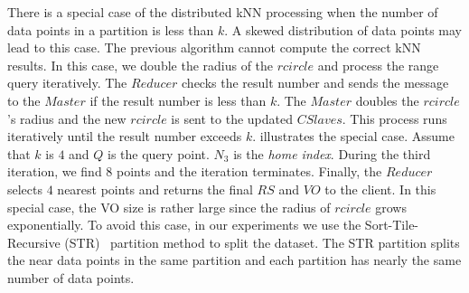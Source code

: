 There is a special case of the distributed kNN processing when the number of data points in a partition is less than $k$. A skewed distribution of data points may lead to this case. The previous algorithm cannot compute the correct kNN results. In this case, we double the radius of the $rcircle$ and process the range query iteratively. The $Reducer$ checks the result number and sends the message to the $Master$ if the result number is less than $k$. The $Master$ doubles the $rcircle$'s radius and the new $rcircle$ is sent to the updated $CSlaves$. This process runs iteratively until the result number exceeds $k$.  illustrates the special case. Assume that $k$ is $4$ and $Q$ is the query point. $N_{3}$ is the \emph{home index}. During the third iteration, we find $8$ points and the iteration terminates. Finally, the $Reducer$ selects $4$ nearest points and returns the final $RS$ and $VO$ to the client. In this special case, the VO size is rather large since the radius of $rcircle$ grows exponentially. To avoid this case, in our experiments we use the Sort-Tile-Recursive (STR)~\cite{10.1109/ICDE.1997.582015} partition method to split the dataset. The STR partition splits the near data points in the same partition and each partition has nearly the same number of data points.

